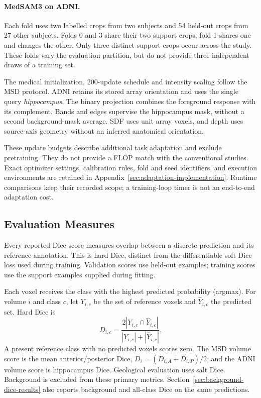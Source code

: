 \documentclass[12pt,a4paper]{article}
\begin{document}
\paragraph{MedSAM3 on ADNI.}\label{sec:medsam-adni-methods}
Each fold uses two labelled crops from two subjects and 54 held-out
crops from 27 other subjects. Folds 0 and 3 share their two support
crops; fold 1 shares one and changes the other. Only three distinct
support crops occur across the study. These folds vary the evaluation
partition, but do not provide three independent draws of a training set.

The medical initialization, 200-update schedule and intensity scaling
follow the MSD protocol. ADNI retains its stored array orientation and
uses the single query \emph{hippocampus}. The binary projection combines
the foreground response with its complement. Bands and edges supervise
the hippocampus mask, without a second background-mask average.
SDF uses unit array voxels, and depth uses source-axis geometry without
an inferred anatomical orientation.

These update budgets describe additional task adaptation and exclude
pretraining. They do not provide a FLOP match with the conventional
studies. Exact optimizer settings, calibration rules, fold and seed
identifiers, and execution environments are retained in
Appendix~\ref{sec:adaptation-implementation}. Runtime comparisons keep
their recorded scope; a training-loop timer is not an end-to-end
adaptation cost.

\subsection{Evaluation Measures}
\label{sec:evaluation-methods}

Every reported Dice score measures overlap between a discrete
prediction and its reference annotation. This is hard Dice, distinct
from the differentiable soft Dice loss used during training.
Validation scores use held-out examples; training scores use the
support examples supplied during fitting.

Each voxel receives the class with the highest predicted probability
(argmax). For volume $i$ and class $c$, let $Y_{i,c}$ be the set of
reference voxels and $\widehat Y_{i,c}$ the predicted set. Hard Dice is
\begin{equation}
 D_{i,c}=\frac{2|Y_{i,c}\cap\widehat Y_{i,c}|}
 {|Y_{i,c}|+|\widehat Y_{i,c}|}.
\label{eq:reported-hard-dice}
\end{equation}
A present reference class with no predicted voxels scores zero.
The MSD volume score is the mean anterior/posterior Dice,
$D_i=(D_{i,A}+D_{i,P})/2$, and the ADNI volume score is hippocampus Dice. Geological evaluation
uses salt Dice.
Background is excluded from these primary metrics.
Section~\ref{sec:background-dice-results} also reports background and
all-class Dice on the same predictions.
\end{document}
